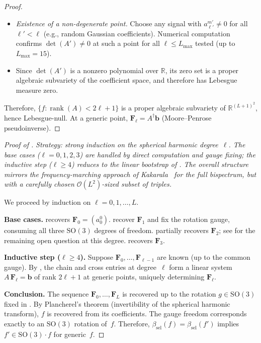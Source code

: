 \documentclass{article}
\theoremstyle{plain}
\theoremstyle{definition}
\theoremstyle{remark}
\newcommand{\SO}{\mathrm{SO}}
\newcommand{\R}{\mathbb{R}}
\begin{document}
\begin{proof}
\begin{itemize}[nosep]
  \item \emph{Existence of a non-degenerate point.}
    Choose any signal with $a_{\ell'}^{m'} \ne 0$ for all
    $\ell' < \ell$ (e.g., random Gaussian coefficients). Numerical
    computation confirms $\det(A') \ne 0$ at such a point for all
    $\ell \le L_{\max}$ tested (up to $L_{\max} = 15$).
  \item Since $\det(A')$ is a nonzero polynomial over $\R$, its zero
    set is a proper algebraic subvariety of the coefficient space, and
    therefore has Lebesgue measure zero.
\end{itemize}

\noindent
Therefore, $\{f : \operatorname{rank}(A) < 2\ell + 1\}$ is a proper
algebraic subvariety of $\R^{(L+1)^2}$, hence Lebesgue-null. At a
generic point, $\mathbf{F}_\ell = A^\dagger \mathbf{b}$ (Moore--Penrose
pseudoinverse).
\end{proof}

\begin{proof}[Proof of ]
\emph{Strategy: strong induction on the spherical harmonic
degree~$\ell$.
The base cases ($\ell = 0, 1, 2, 3$) are handled by direct
computation and gauge fixing; the inductive step ($\ell \ge 4$)
reduces to the linear bootstrap of .
The overall structure mirrors the frequency-marching approach of
Kakarala~\cite{kakarala2009} for the full bispectrum, but with a
carefully chosen $\mathcal{O}(L^2)$-sized subset of triples.}

We proceed by induction on $\ell = 0, 1, \dotsc, L$.

\medskip\noindent
\textbf{Base cases.}
 recovers $\mathbf{F}_0 = (a_0^0)$.
 recover $\mathbf{F}_1$ and fix the rotation
gauge, consuming all three $\SO(3)$ degrees of freedom.
 partially recovers $\mathbf{F}_2$; see
 for the remaining open question at this degree.
 recovers $\mathbf{F}_3$.

\medskip\noindent
\textbf{Inductive step ($\ell \ge 4$).}
Suppose $\mathbf{F}_0, \dotsc, \mathbf{F}_{\ell-1}$ are known (up to
the common gauge). By , the chain and cross
entries at degree~$\ell$ form a linear system
$A\,\mathbf{F}_\ell = \mathbf{b}$ of rank $2\ell+1$ at generic points,
uniquely determining $\mathbf{F}_\ell$.

\medskip\noindent
\textbf{Conclusion.}
The sequence $\mathbf{F}_0, \dotsc, \mathbf{F}_L$ is recovered up to
the rotation $g \in \SO(3)$ fixed in . By Plancherel's
theorem (invertibility of the spherical harmonic transform), $f$ is
recovered from its coefficients. The gauge freedom corresponds exactly
to an $\SO(3)$ rotation of~$f$. Therefore,
$\beta_{\mathrm{sel}}(f) = \beta_{\mathrm{sel}}(f')$ implies
$f' \in \SO(3) \cdot f$ for generic~$f$.
\end{proof}
\end{document}
